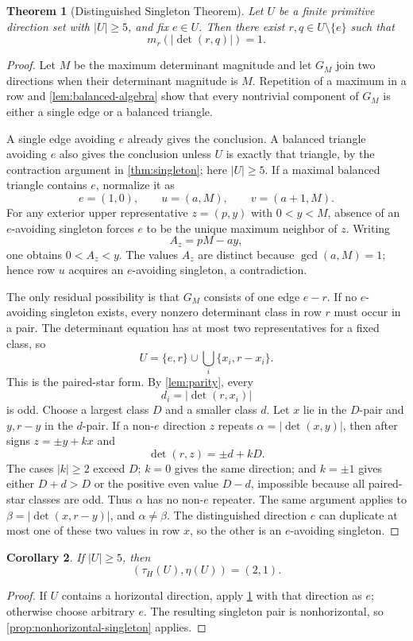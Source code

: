 \documentclass[11pt]{article}
\newtheorem{theorem}{Theorem}[section]
\newtheorem{corollary}[theorem]{Corollary}
\theoremstyle{definition}
\begin{document}
\begin{theorem}[Distinguished Singleton Theorem]\label{thm:distinguished}
Let $U$ be a finite primitive direction set with $|U|\ge5$, and fix $e\in U$.  Then there exist $r,q\in U\setminus\{e\}$ such that
\[
\boxed{m_r(|\det(r,q)|)=1.}
\]
\end{theorem}
\begin{proof}
Let $M$ be the maximum determinant magnitude and let $G_M$ join two directions when their determinant magnitude is $M$.  Repetition of a maximum in a row and \cref{lem:balanced-algebra} show that every nontrivial component of $G_M$ is either a single edge or a balanced triangle.

A single edge avoiding $e$ already gives the conclusion.  A balanced triangle avoiding $e$ also gives the conclusion unless $U$ is exactly that triangle, by the contraction argument in \cref{thm:singleton}; here $|U|\ge5$.  If a maximal balanced triangle contains $e$, normalize it as
\[
e=(1,0),\qquad u=(a,M),\qquad v=(a+1,M).
\]
For any exterior upper representative $z=(p,y)$ with $0<y<M$, absence of an $e$-avoiding singleton forces $e$ to be the unique maximum neighbor of $z$.  Writing
\[
A_z=pM-ay,
\]
one obtains $0<A_z<y$.  The values $A_z$ are distinct because $\gcd(a,M)=1$; hence row $u$ acquires an $e$-avoiding singleton, a contradiction.

The only residual possibility is that $G_M$ consists of one edge $e-r$.  If no $e$-avoiding singleton exists, every nonzero determinant class in row $r$ must occur in a pair.  The determinant equation has at most two representatives for a fixed class, so
\[
U=\{e,r\}\cup\bigcup_i\{x_i,r-x_i\}.
\]
This is the paired-star form.  By \cref{lem:parity}, every
\[
d_i=|\det(r,x_i)|
\]
is odd.  Choose a largest class $D$ and a smaller class $d$.  Let $x$ lie in the $D$-pair and $y,r-y$ in the $d$-pair.  If a non-$e$ direction $z$ repeats $\alpha=|\det(x,y)|$, then after signs $z=\pm y+kx$ and
\[
\det(r,z)=\pm d+kD.
\]
The cases $|k|\ge2$ exceed $D$; $k=0$ gives the same direction; and $k=\pm1$ gives either $D+d>D$ or the positive even value $D-d$, impossible because all paired-star classes are odd.  Thus $\alpha$ has no non-$e$ repeater.  The same argument applies to $\beta=|\det(x,r-y)|$, and $\alpha\ne\beta$.  The distinguished direction $e$ can duplicate at most one of these two values in row $x$, so the other is an $e$-avoiding singleton.
\end{proof}

\begin{corollary}\label{cor:large-U}
If $|U|\ge5$, then
\[
\boxed{(\tau_H(U),\eta(U))=(2,1).}
\]
\end{corollary}
\begin{proof}
If $U$ contains a horizontal direction, apply \cref{thm:distinguished} with that direction as $e$; otherwise choose arbitrary $e$.  The resulting singleton pair is nonhorizontal, so \cref{prop:nonhorizontal-singleton} applies.
\end{proof}
\end{document}
